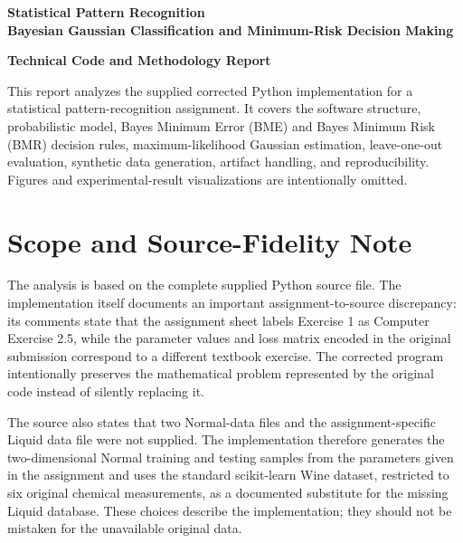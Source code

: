\documentclass[11pt,a4paper]{article}
\begin{document}
\begin{titlepage}
\centering
\vspace*{2.0cm}
{\LARGE\bfseries Statistical Pattern Recognition\\[0.35em]
Bayesian Gaussian Classification and Minimum-Risk Decision Making\par}
\vspace{1.0cm}
{\large\bfseries Technical Code and Methodology Report\par}
\vspace{1.5cm}
\begin{minipage}{0.88\textwidth}
\centering
\small
This report analyzes the supplied corrected Python implementation for a statistical pattern-recognition assignment. It covers the software structure, probabilistic model, Bayes Minimum Error (BME) and Bayes Minimum Risk (BMR) decision rules, maximum-likelihood Gaussian estimation, leave-one-out evaluation, synthetic data generation, artifact handling, and reproducibility. Figures and experimental-result visualizations are intentionally omitted.
\end{minipage}
\vfill
\end{titlepage}

\tableofcontents
\newpage

\section*{Scope and Source-Fidelity Note}
The analysis is based on the complete supplied Python source file. The implementation itself documents an important assignment-to-source discrepancy: its comments state that the assignment sheet labels Exercise 1 as Computer Exercise 2.5, while the parameter values and loss matrix encoded in the original submission correspond to a different textbook exercise. The corrected program intentionally preserves the mathematical problem represented by the original code instead of silently replacing it.


The source also states that two Normal-data files and the assignment-specific Liquid data file were not supplied. The implementation therefore generates the two-dimensional Normal training and testing samples from the parameters given in the assignment and uses the standard scikit-learn Wine dataset, restricted to six original chemical measurements, as a documented substitute for the missing Liquid database. These choices describe the implementation; they should not be mistaken for the unavailable original data.
\end{document}
